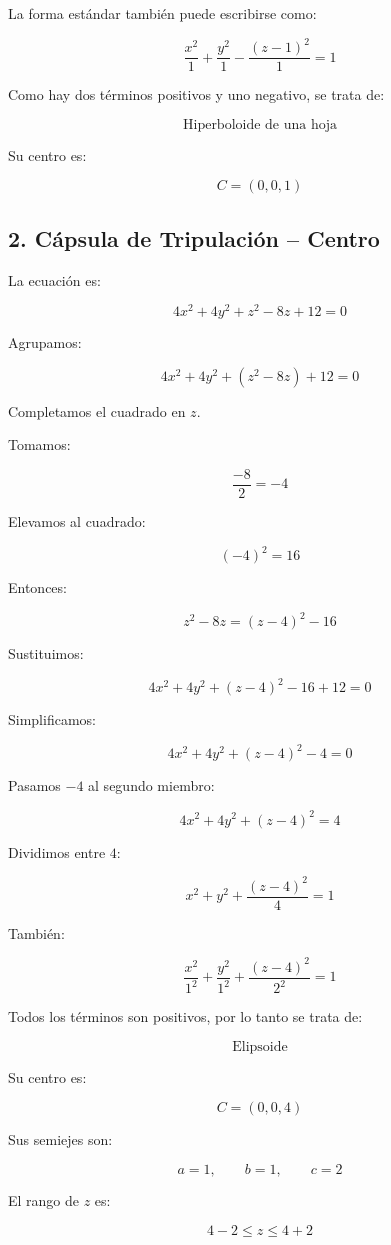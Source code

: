 \documentclass[12pt,a4paper]{article}
\begin{document}
La forma estándar también puede escribirse como:

\[\boxed{\frac{x^2}{1}+\frac{y^2}{1}-\frac{(z-1)^2}{1}=1}\]

Como hay dos términos positivos y uno negativo, se trata de:

\[\boxed{\text{Hiperboloide de una hoja}}\]

Su centro es:

\[\boxed{C=(0,0,1)}\]

\subsection{2. Cápsula de Tripulación -- Centro}

La ecuación es:

\[4x^2+4y^2+z^2-8z+12=0\]

Agrupamos:

\[4x^2+4y^2+(z^2-8z)+12=0\]

Completamos el cuadrado en $z$.

Tomamos:

\[\frac{-8}{2}=-4\]

Elevamos al cuadrado:

\[(-4)^2=16\]

Entonces:

\[z^2-8z=(z-4)^2-16\]

Sustituimos:

\[4x^2+4y^2+(z-4)^2-16+12=0\]

Simplificamos:

\[4x^2+4y^2+(z-4)^2-4=0\]

Pasamos $-4$ al segundo miembro:

\[4x^2+4y^2+(z-4)^2=4\]

Dividimos entre $4$:

\[\boxed{x^2+y^2+\frac{(z-4)^2}{4}=1}\]

También:

\[\boxed{\frac{x^2}{1^2}+\frac{y^2}{1^2}+\frac{(z-4)^2}{2^2}=1}\]

Todos los términos son positivos, por lo tanto se trata de:

\[\boxed{\text{Elipsoide}}\]

Su centro es:

\[\boxed{C=(0,0,4)}\]

Sus semiejes son:

\[a=1,\qquad b=1,\qquad c=2\]

El rango de $z$ es:

\[4-2\leq z\leq4+2\]
\end{document}
